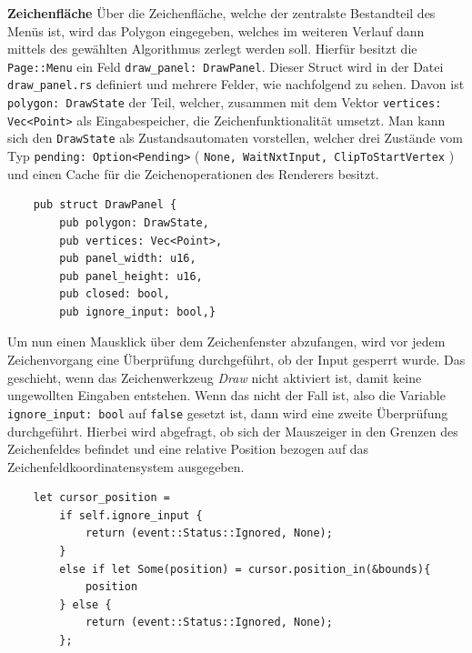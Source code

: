 \textbf{Zeichenfläche}\linebreak
Über die Zeichenfläche, welche der zentralste Bestandteil des Menüs ist, wird das Polygon eingegeben, welches im weiteren Verlauf dann mittels des gewählten Algorithmus zerlegt werden soll.
Hierfür besitzt die \lstinline{Page::Menu} ein Feld \lstinline{draw_panel: DrawPanel}. Dieser Struct wird in der Datei \lstinline{draw_panel.rs} definiert und mehrere Felder, wie nachfolgend zu sehen. 
Davon ist \lstinline{polygon: DrawState} der Teil, welcher, zusammen mit dem Vektor \lstinline{vertices: Vec<Point>} als Eingabespeicher, die Zeichenfunktionalität umsetzt. Man kann sich den \lstinline{DrawState} als Zustandsautomaten 
vorstellen, welcher drei Zustände vom Typ \lstinline{pending: Option<Pending>} ( \lstinline{None, WaitNxtInput, ClipToStartVertex} ) und einen Cache für die Zeichenoperationen des Renderers besitzt. 

\begin{lstlisting}
    pub struct DrawPanel {
        pub polygon: DrawState,
        pub vertices: Vec<Point>,
        pub panel_width: u16,
        pub panel_height: u16,
        pub closed: bool,
        pub ignore_input: bool,}
\end{lstlisting}

Um nun einen Mausklick über dem Zeichenfenster abzufangen, wird vor jedem Zeichenvorgang eine Überprüfung durchgeführt, ob der Input gesperrt wurde. Das geschieht, wenn 
das Zeichenwerkzeug \emph{Draw} nicht aktiviert ist, damit keine ungewollten Eingaben entstehen. Wenn das nicht der Fall ist, also die Variable \lstinline{ignore_input: bool} auf \lstinline{false} gesetzt ist, dann 
wird eine zweite Überprüfung durchgeführt. Hierbei wird abgefragt, ob sich der Mauszeiger in den Grenzen des Zeichenfeldes befindet und eine relative Position bezogen auf das Zeichenfeldkoordinatensystem ausgegeben.

\begin{lstlisting}
    let cursor_position =
        if self.ignore_input {
            return (event::Status::Ignored, None);
        }
        else if let Some(position) = cursor.position_in(&bounds){
            position
        } else {
            return (event::Status::Ignored, None);
        };

\end{lstlisting}


